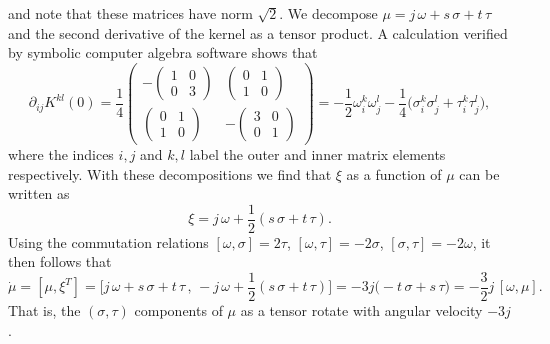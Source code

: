 \documentclass[12pt]{amsart}
\begin{document}
and note that these matrices have norm $\sqrt{2}$. We decompose
$\mu = j\,\omega + s\,\sigma + t\,\tau$ and the second derivative of
the kernel as a tensor product. A calculation verified by symbolic
computer algebra software shows that
\begin{equation*}
  \partial_{ij} K^{kl}(0)
  = \frac{1}{4} \left(\begin{array}{rr}
     -\begin{pmatrix} 1 & 0 \\ 0 & 3 \end{pmatrix} &
      \begin{pmatrix} 0 & 1 \\ 1 & 0 \end{pmatrix} \\[2.5ex]
      \begin{pmatrix} 0 & 1 \\ 1 & 0 \end{pmatrix} &
     -\begin{pmatrix} 3 & 0 \\ 0 & 1 \end{pmatrix}
    \end{array}\right)
  =-\frac{1}{2} \omega_i^k \omega_j^l
   -\frac{1}{4} \big( \sigma_i^k \sigma_j^l + \tau_i^k \tau_j^l \big),
\end{equation*}
where the indices $i,j$ and $k,l$ label the outer and inner matrix
elements respectively. With these decompositions we find that $\xi$ as
a function of $\mu$ can be written as
\begin{equation*}
  \xi = j\,\omega + \frac{1}{2}(s\,\sigma + t\,\tau).
\end{equation*}
Using the commutation relations $[\omega,\sigma] = 2\tau$,
$[\omega,\tau] = -2\sigma$, $[\sigma,\tau] = -2\omega$, it then
follows that
\begin{equation}\label{eq:mu-dynamics}
  \dot{\mu}
  = [\mu , \xi^T]
  = \big[j\,\omega+s\,\sigma+t\,\tau \,,\, -j\,\omega + \frac{1}{2}(s\,\sigma + t\,\tau)\big]
  = -3j\big(-t\,\sigma + s\,\tau\big)
  = -\frac{3}{2}j\,[\omega,\mu].
\end{equation}
That is, the $(\sigma,\tau)$ components of $\mu$ as a tensor rotate
with angular velocity $-3j$.
\end{document}
